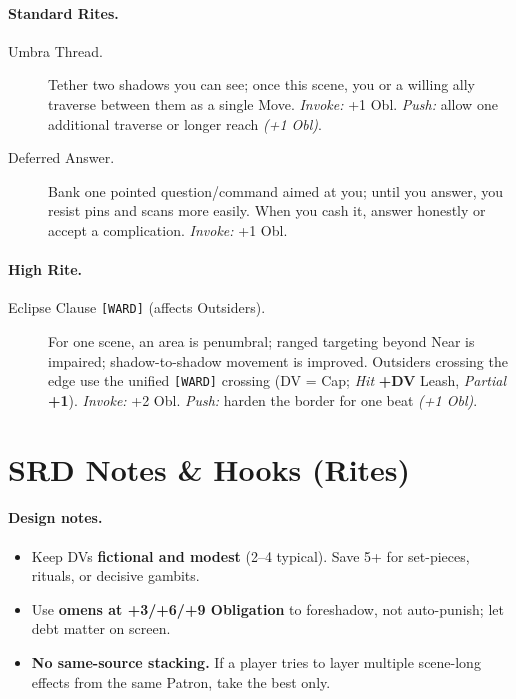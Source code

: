 \documentclass[11pt]{article}
\begin{document}
\paragraph{Standard Rites.}
\begin{description}
  \item[Umbra Thread.] Tether two shadows you can see; once this scene, you or a willing ally traverse between them as a single Move. \emph{Invoke:} +1 Obl. \emph{Push:} allow one additional traverse or longer reach \emph{(+1 Obl)}.
  \item[Deferred Answer.] Bank one pointed question/command aimed at you; until you answer, you resist pins and scans more easily. When you cash it, answer honestly or accept a complication. \emph{Invoke:} +1 Obl.
\end{description}

\paragraph{High Rite.}
\begin{description}
  \item[Eclipse Clause \texttt{[WARD]} (affects Outsiders).] For one scene, an area is penumbral; ranged targeting beyond Near is impaired; shadow-to-shadow movement is improved. Outsiders crossing the edge use the unified \texttt{[WARD]} crossing (DV = Cap; \emph{Hit} \textbf{+DV} Leash, \emph{Partial} \textbf{+1}). \emph{Invoke:} +2 Obl. \emph{Push:} harden the border for one beat \emph{(+1 Obl)}.
\end{description}

\bigskip

\section{SRD Notes \& Hooks (Rites)}

\paragraph{Design notes.}
\begin{itemize}
  \item Keep DVs \textbf{fictional and modest} (2–4 typical). Save 5+ for set-pieces, rituals, or decisive gambits.
  \item Use \textbf{omens at +3/+6/+9 Obligation} to foreshadow, not auto-punish; let debt matter on screen.
  \item \textbf{No same-source stacking.} If a player tries to layer multiple scene-long effects from the same Patron, take the best only.
\end{itemize}
\end{document}
